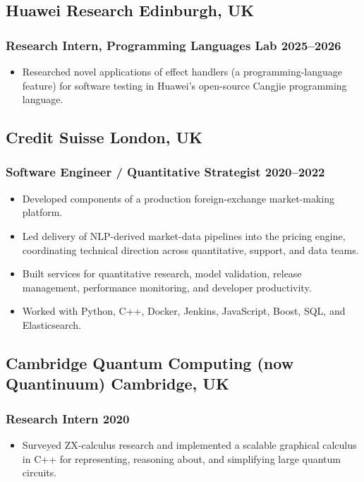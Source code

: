 \documentclass[10pt]{article}
\newcommand{\rside}[1]{\hfill {\normalfont\color{accent} #1}}
\begin{document}
\subsection{Huawei Research \rside{Edinburgh, UK}}
\subsubsection{Research Intern, Programming Languages Lab \rside{2025--2026}}
\begin{itemize}
  \item Researched novel applications of effect handlers (a programming-language feature) for software testing in Huawei's open-source Cangjie programming language.
\end{itemize}

\subsection{Credit Suisse \rside{London, UK}}
\subsubsection{Software Engineer / Quantitative Strategist \rside{2020--2022}}
\begin{itemize}
  \item Developed components of a production foreign-exchange market-making platform.
  \item Led delivery of NLP-derived market-data pipelines into the pricing engine, coordinating technical direction across quantitative, support, and data teams.
  \item Built services for quantitative research, model validation, release management, performance monitoring, and developer productivity.
  \item Worked with Python, C++, Docker, Jenkins, JavaScript, Boost, SQL, and Elasticsearch.
\end{itemize}

\subsection{Cambridge Quantum Computing (now Quantinuum) \rside{Cambridge, UK}}
\subsubsection{Research Intern \rside{2020}}
\begin{itemize}
  \item Surveyed ZX-calculus research and implemented a scalable graphical calculus in C++ for representing, reasoning about, and simplifying large quantum circuits.
\end{itemize}
\end{document}
